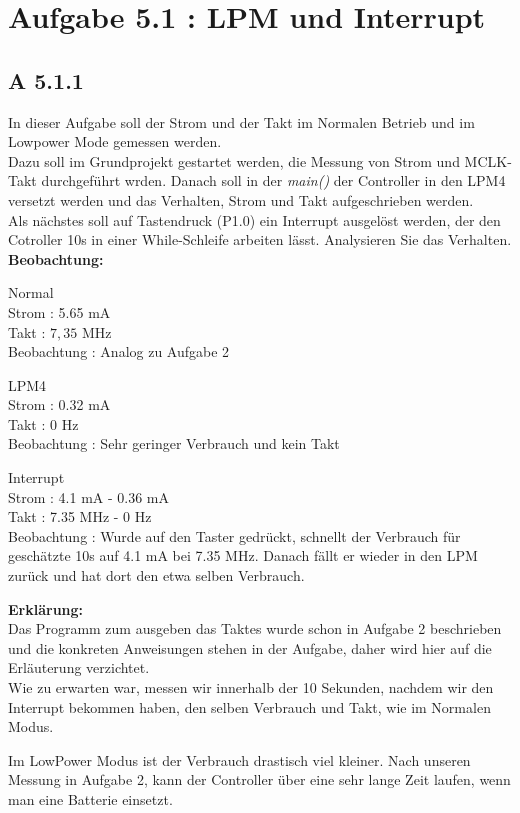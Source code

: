 \section{Aufgabe 5.1 : LPM und Interrupt}

\subsection{A 5.1.1}

In dieser Aufgabe soll der Strom und der Takt im Normalen Betrieb und im Lowpower Mode gemessen werden.\\

Dazu soll im Grundprojekt gestartet werden, die Messung von Strom und MCLK-Takt durchgeführt wrden. Danach soll in der \emph{main()} der Controller in den LPM4 versetzt werden und das Verhalten, Strom und Takt aufgeschrieben werden.\\

Als nächstes soll auf Tastendruck (P1.0) ein Interrupt ausgelöst werden, der den Cotroller 10s in einer While-Schleife arbeiten lässt. Analysieren Sie das Verhalten.\\

\textbf{Beobachtung:}\\

\begin{description}

\item{Normal}\\
	Strom : 5.65 mA\\
	Takt : $7,35$ MHz\\
	Beobachtung : Analog zu Aufgabe 2 

\item{LPM4}\\
	Strom : 0.32 mA\\
	Takt : 0 Hz\\
	Beobachtung : Sehr geringer Verbrauch und kein Takt

\item{Interrupt}\\
	Strom : 4.1 mA - 0.36 mA\\
	Takt :  7.35 MHz - 0 Hz\\
	Beobachtung : Wurde auf den Taster gedrückt, schnellt der Verbrauch für geschätzte 10s auf 4.1 mA bei 7.35 MHz. Danach fällt er wieder
			in den LPM zurück und hat dort den etwa selben Verbrauch.

\end{description}

\textbf{Erklärung:}\\

Das Programm zum ausgeben das Taktes wurde schon in Aufgabe 2 beschrieben und die konkreten Anweisungen stehen in der Aufgabe, daher wird hier auf die Erläuterung verzichtet.\\

Wie zu erwarten war, messen wir innerhalb der 10 Sekunden, nachdem wir den Interrupt bekommen haben, den selben Verbrauch und Takt, wie im Normalen Modus.

Im LowPower Modus ist der Verbrauch drastisch viel kleiner. Nach unseren Messung in Aufgabe 2, kann der Controller über eine sehr lange Zeit laufen, wenn man eine Batterie einsetzt.